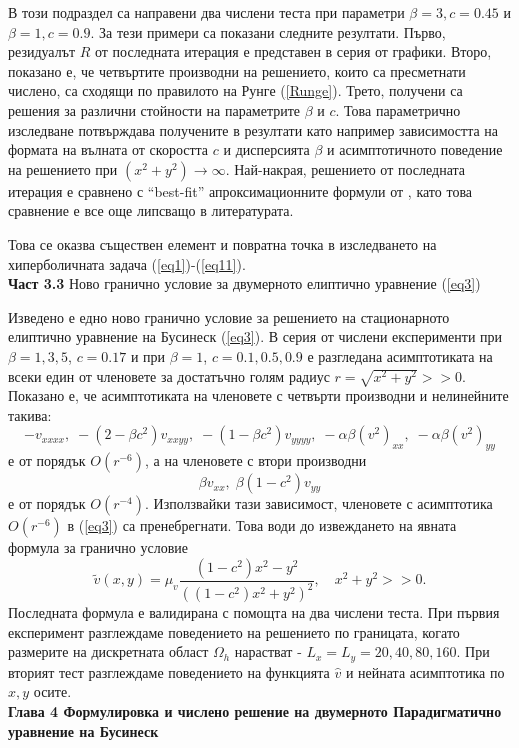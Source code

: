 \documentclass[a5paper]{article}
\newcommand{\be}{\begin{equation}}
\newcommand{\ee}{\end{equation}}
\newcommand{\rf}[1]{(\ref{#1})}
\theoremstyle{remark}
\begin{document}
\begin{normalsize}
В този подраздел са направени два числени теста при параметри $\beta = 3, c=0.45$ и $\beta = 1, c=0.9$. За тези примери са показани следните резултати. Първо, резидуалът $R$ от последната итерация е представен в серия от графики. Второ, показано е, че четвъртите производни на решението, които са пресметнати числено, са сходящи по правилото на Рунге \rf{Runge}. Трето, получени са решения за различни стойности на параметрите $\beta$ и $c$. Това параметрично изследване потвърждава получените в \cite{ref116,ref15} резултати като например зависимостта на формата на вълната от скоростта $c$ и дисперсията $\beta$ и асимптотичното поведение на решението при $(x^2 + y^2) \rightarrow \infty$. Най-накрая, решението от последната итерация е сравнено с ``best-fit'' апроксимационните формули от \cite{ref15}, като това сравнение е все още липсващо в литературата. 

Това се оказва съществен елемент и повратна точка в изследването на хиперболичната задача \rf{eq1}-\rf{eq11}. \\

\textbf{Част 3.3} Ново гранично условие за двумерното елиптично уравнение \rf{eq3}

Изведено е едно ново гранично условие за решението на стационарното елиптично уравнение на Бусинеск \rf{eq3}. В серия от числени експерименти при $\beta=1,3,5$, $c=0.17$ и при $\beta=1$, $c=0.1, 0.5, 0.9$ е разгледана асимптотиката на всеки един от членовете за достатъчно голям радиус $r=\sqrt{x^2 + y^2} >> 0$. Показано е, че асимптотиката на членовете с четвърти производни и нелинейните такива: 
$$- v_{xxxx}, \;  - (2-\beta c^2)v_{xxyy},  \;  - (1-\beta c^2)v_{yyyy}, \;  - \alpha \beta (v^2)_{xx}, \; - \alpha \beta (v^2)_{yy}$$
е от порядък $O(r^{-6})$, а на членовете с втори производни 
$$\beta v_{xx}, \; \beta (1-c^2) v_{yy}$$
 е от порядък $O(r^{-4})$. Използвайки тази зависимост, членовете с асимптотика $O(r^{-6})$ в \rf{eq3} са пренебрегнати. Това води до извеждането на явната формула за гранично условие
\be
\tilde v(x, y) = \mu_v \frac{ (1-c^2) x^2 - y^2 }{ ((1-c^2) x^2 + y^2)^2 }, \quad x^2+y^2 >> 0.
\ee
Последната формула е валидирана с помощта на два числени теста. При първия експеримент разглеждаме поведението на решението по границата, когато размерите на дискретната област $\Omega_h$ нарастват - $L_x = L_y = 20, 40, 80, 160$. При вторият тест разглеждаме поведението на функцията $\widehat v$ и нейната асимптотика по $x,y$ осите.\\

\textbf{Глава 4 Формулировка и числено решение на двумерното Парадигматично уравнение на Бусинеск} 


\end{normalsize}
\end{document}
